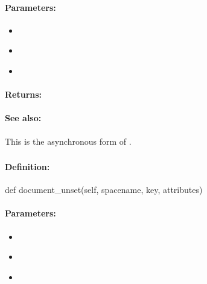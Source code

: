 \paragraph{Parameters:}
\begin{itemize}[noitemsep]
\item {}\\

\item {}\\

\item {}\\

\end{itemize}

\paragraph{Returns:}


\paragraph{See also:}  This is the asynchronous form of .

\pagebreak
\subsubsection{}
\label{api:python:document_unset}


\paragraph{Definition:}
\begin{pythoncode}
def document_unset(self, spacename, key, attributes)
\end{pythoncode}

\paragraph{Parameters:}
\begin{itemize}[noitemsep]
\item {}\\

\item {}\\

\item {}\\

\end{itemize}

